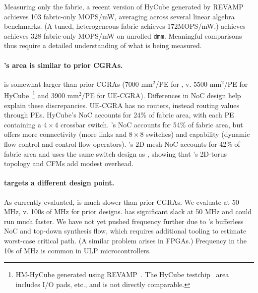 Measuring only the fabric,
a recent version of HyCube generated by REVAMP~\cite{revamp}
achieves 103 fabric-only MOPS/mW,
averaging across several linear
algebra benchmarks.
%
(A tuned, heterogeneous fabric achieves 172MOPS/mW.)
%
\riptide achieves achieves 328 fabric-only MOPS/mW on unrolled {\tt dmm}.
%
Meaningful comparisons thus require a detailed understanding
of what is being measured.

\paragraph{\riptide's area is similar to prior CGRAs.}
\riptide is somewhat larger than prior CGRAs
(7000 \textmu mm$^2$/PE for \riptide, v.
5500 \textmu mm$^2$/PE for HyCube~\cite{revamp}\footnote{HM-HyCube generated using REVAMP~\cite{revamp}. The HyCube testchip~\cite{wang2019hycube} area includes I/O pads, etc., and is not directly comparable.}
and 3900 \textmu mm$^2$/PE for UE-CGRA).
% 
Differences in NoC design help explain these discrepancies.
%
UE-CGRA has no routers, instead routing values through PEs.
%
% 
HyCube's NoC accounts for 24\% of fabric area, with each PE containing a $4\times4$ crossbar switch.
% 
\riptide's NoC accounts for 54\% of fabric area, but offers more connectivity (more links and $8\times8$ switches) and capability (dynamic flow control and control-flow operators).
%
\snafu's 2D-mesh NoC accounts for 42\% of fabric area and uses the same switch design as \riptide, showing that \riptide's 2D-torus topology and CFMs add modest overhead.

\paragraph{\riptide targets a different design point.}
As currently evaluated, \riptide is much slower than prior CGRAs.
%
We evaluate \riptide at 50 MHz,
v. 100s of MHz for prior designs.
%
\riptide has significant slack at 50 MHz
and could run much faster.
%
We have not yet pushed frequency further
due to \riptide's bufferless NoC
and top-down synthesis flow,
which requires additional tooling to
estimate worst-case critical path.
(A similar problem arises in FPGAs.)
%
Frequency in the 10s of MHz is
common in ULP microcontrollers.

